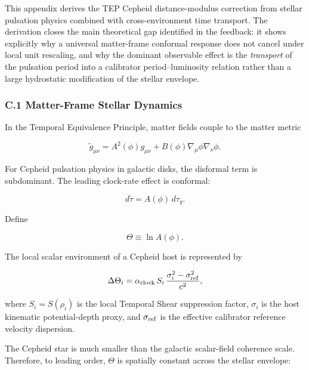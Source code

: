 \documentclass[
]{article}
\begin{document}
This appendix derives the TEP Cepheid distance-modulus correction from
stellar pulsation physics combined with cross-environment time
transport. The derivation closes the main theoretical gap identified in
the feedback: it shows explicitly why a universal matter-frame conformal
response does not cancel under local unit rescaling, and why the
dominant observable effect is the \emph{transport} of the pulsation
period into a calibrator period--luminosity relation rather than a large
hydrostatic modification of the stellar envelope.

\subsubsection{C.1 Matter-Frame Stellar
Dynamics}\label{c.1-matter-frame-stellar-dynamics}

In the Temporal Equivalence Principle, matter fields couple to the
matter metric

\begin{equation}
\tilde g_{\mu\nu} = A^2(\phi)g_{\mu\nu} + B(\phi)\nabla_\mu\phi\nabla_\nu\phi .
\end{equation}

For Cepheid pulsation physics in galactic disks, the disformal term is
subdominant. The leading clock-rate effect is conformal:

\begin{equation}
d\tilde\tau = A(\phi)\,d\tau_g .
\end{equation}

Define

\begin{equation}
\Theta \equiv \ln A(\phi) .
\end{equation}

The local scalar environment of a Cepheid host is represented by

\begin{equation}
\Delta\Theta_i = \alpha_{\rm clock}\,S_i\,\frac{\sigma_i^2 - \sigma_{\rm ref}^2}{c^2},
\end{equation}

where \(S_i = S(\rho_i)\) is the local Temporal Shear suppression
factor, \(\sigma_i\) is the host kinematic potential-depth proxy, and
\(\sigma_{\rm ref}\) is the effective calibrator reference velocity
dispersion.

The Cepheid star is much smaller than the galactic scalar-field
coherence scale. Therefore, to leading order, \(\Theta\) is spatially
constant across the stellar envelope:
\end{document}
